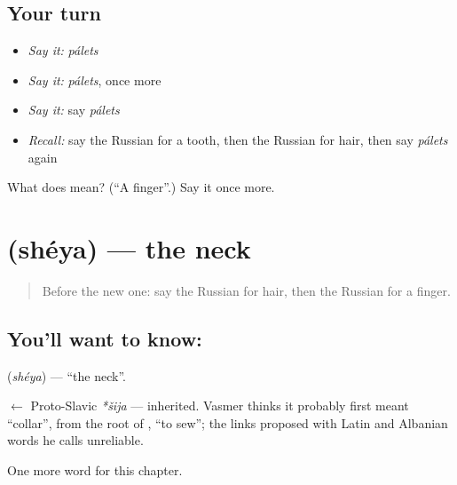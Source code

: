 \subsection*{Your turn}
\begin{itemize}
\raggedright
  \item \emph{Say it:} \emph{pálets}
  \item \emph{Say it:} \emph{pálets}, once more
  \item \emph{Say it:} say \emph{pálets}
  \item \emph{Recall:} say the Russian for a tooth, then the Russian for hair, then say \emph{pálets} again
\end{itemize}

\begin{tcolorbox}[breakable,colback=teal!4,colframe=teal!35!black,title={Before you move on}]
What does  mean? (\textquotedblleft{}A finger\textquotedblright{}.) Say it once more.
\end{tcolorbox}
\section[\texorpdfstring{\ru{шея} (shéya)}{шея (shéya)}]{ (shéya) — the neck}

\label{lesson:RU-C30-neck}



\begin{quote}
Before the new one: say the Russian for hair, then the Russian for a finger.
\end{quote}

\subsection*{You'll want to know: }
\textbf{} (\emph{shéya}) — \textquotedblleft{}the neck\textquotedblright{}.

\begin{cousinweb}
\textbf{} $\leftarrow$ Proto-Slavic \emph{*šija} — inherited. Vasmer thinks it probably first meant \textquotedblleft{}collar\textquotedblright{}, from the root of \emph{}, \textquotedblleft{}to sew\textquotedblright{}; the links proposed with Latin and Albanian words he calls unreliable.
\end{cousinweb}

\begin{grammarlens}[title={What you've built}]
One more word for this chapter.
\end{grammarlens}

